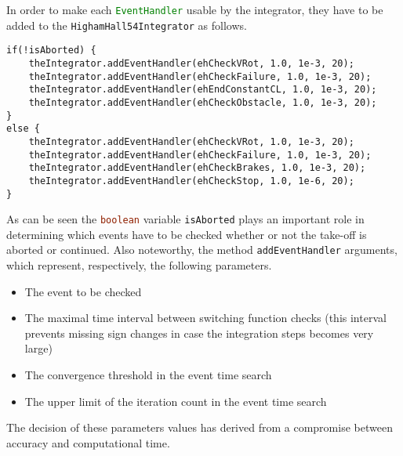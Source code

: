 \bigskip
\noindent
In order to make each \lstinline[language=Java]!EventHandler! usable by the integrator, they have to be added to the \lstinline[language=Java]!HighamHall54Integrator! as follows.

\bigskip
\begin{lstlisting}[caption={HighamHall54Integrator class object creation}, captionpos=b, tabsize=2]
if(!isAborted) {
	theIntegrator.addEventHandler(ehCheckVRot, 1.0, 1e-3, 20);
	theIntegrator.addEventHandler(ehCheckFailure, 1.0, 1e-3, 20);
	theIntegrator.addEventHandler(ehEndConstantCL, 1.0, 1e-3, 20);
	theIntegrator.addEventHandler(ehCheckObstacle, 1.0, 1e-3, 20);
}
else {
	theIntegrator.addEventHandler(ehCheckVRot, 1.0, 1e-3, 20);
	theIntegrator.addEventHandler(ehCheckFailure, 1.0, 1e-3, 20);
	theIntegrator.addEventHandler(ehCheckBrakes, 1.0, 1e-3, 20);
	theIntegrator.addEventHandler(ehCheckStop, 1.0, 1e-6, 20);
}
\end{lstlisting}
%
As can be seen the \lstinline[language=Java]!boolean! variable \lstinline[language=Java]!isAborted! plays an important role in determining which events have to be checked whether or not the take-off is aborted or continued. Also noteworthy, the method \lstinline[language=Java]!addEventHandler! arguments, which represent, respectively, the following parameters.
%
\begin{itemize}
\item The event to be checked
\item The maximal time interval between switching function checks (this interval prevents missing sign changes in case the integration steps becomes very large)
\item The convergence threshold in the event time search
\item The upper limit of the iteration count in the event time search
\end{itemize}
%
The decision of these parameters values has derived from a compromise between accuracy and computational time.

